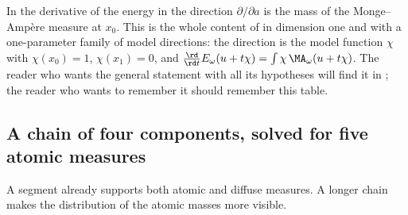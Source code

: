 \begin{remark}
\label{rem:ch31-two-component-derivative}
In  the derivative of the energy in the
direction $\partial/\partial a$ is the mass of the Monge--Amp\`ere measure
at $x_0$.  This is the whole content of
 in dimension one and with a
one-parameter family of model directions: the direction is the model
function $\chi$ with $\chi(x_0)=1$, $\chi(x_1)=0$, and
$\frac{\rd}{\rd t}E_\omega(u+t\chi)=\int\chi\,\MA_\omega(u+t\chi)$.
The reader who wants the general statement with all its hypotheses will
find it in ; the reader who wants to remember it
should remember this table.
\end{remark}

\subsection{A chain of four components, solved for five atomic measures}
\label{sec:ch31-chain}

A segment already supports both atomic and diffuse measures.  A longer
chain makes the distribution of the atomic masses more visible.

